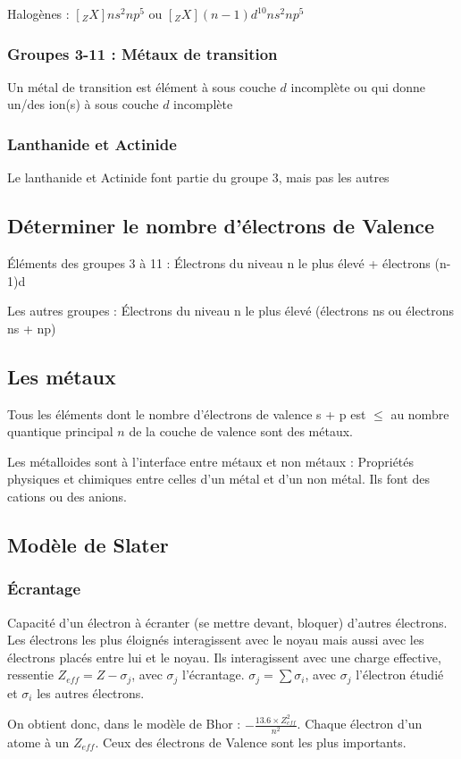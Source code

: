 \documentclass[french]{yLectureNote}
\begin{document}
Halogènes : $[_ZX]ns^2 np^5$ ou $[_ZX](n-1)d^{10} ns^2 np^5$
\subsubsection{Groupes 3-11 : Métaux de transition}
\begin{theorem}
Un métal de transition est élément à sous couche $d$ incomplète ou qui donne un/des ion(s) à sous couche $d$ incomplète
\end{theorem}

\subsubsection{Lanthanide et Actinide}
Le lanthanide et Actinide font partie du groupe 3, mais pas les autres
\subsection{Déterminer le nombre d'électrons de Valence}
Éléments des groupes 3 à 11 : Électrons du niveau n le plus élevé + électrons (n-1)d

Les autres groupes : Électrons du niveau n le plus élevé (électrons ns ou électrons ns + np)

\subsection{Les métaux}
\begin{theorem}[]
Tous
les éléments dont le nombre
d’électrons de valence s + p
est $\leq$ au nombre quantique
principal $n$ de la couche de
valence sont des métaux.
\end{theorem}

Les métalloides sont à l'interface entre métaux et non métaux : Propriétés physiques et chimiques entre celles d'un métal et d'un non métal. Ils font des cations ou des anions.


\subsection{Modèle de Slater}
\subsubsection{Écrantage}
\begin{theorem}
Capacité d'un électron à écranter (se mettre devant, bloquer) d'autres électrons. Les électrons les plus éloignés interagissent avec le noyau mais aussi avec les électrons placés entre lui et le noyau. Ils interagissent avec une charge effective, ressentie $Z_{eff} = Z-\sigma_j$, avec $\sigma_j$ l'écrantage.
$\sigma_j = \sum \sigma_i$, avec $\sigma_j$ l'électron étudié et $\sigma_i$ les autres électrons.
\end{theorem}
On obtient donc, dans le modèle de Bhor : $-\frac{13.6\times Z_{eff}^2}{n^2}$.
Chaque électron d'un atome à un $Z_{eff}$. Ceux des électrons de Valence sont les plus importants.
\end{document}
